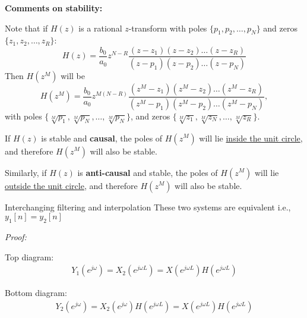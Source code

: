 \documentclass[10pt, handout]{beamer}
\begin{document}
\begin{frame}
\textbf{Comments on stability:}

Note that if $H(z)$ is a rational $z$-transform with poles $\{p_1, p_2, \ldots, p_N\}$ and zeros $\{z_1, z_2, \ldots, z_R\}$:
\begin{equation*}
H(z) = \frac{b_0}{a_0}z^{N-R}\frac{(z-z_1)(z-z_2)\ldots(z-z_R)}{(z-p_1)(z-p_2)\ldots(z-p_N)}
\end{equation*}
Then $H(z^M)$ will be
\begin{equation*}
H(z^M) = \frac{b_0}{a_0}z^{M(N-R)}\frac{(z^M-z_1)(z^M-z_2)\ldots(z^M-z_R)}{(z^M-p_1)(z^M-p_2)\ldots(z^M-p_N)},
\end{equation*}
with poles $\{\sqrt[M]{p_1}, \sqrt[M]{p_N}, \ldots, \sqrt[M]{p_N}\}$, and zeros $\{\sqrt[M]{z_1}, \sqrt[M]{z_N}, \ldots, \sqrt[M]{z_R}\}$.
 
If $H(z)$ is stable and \textbf{causal}, the poles of $H(z^M)$ will lie \underline{inside the unit circle}, and therefore $H(z^M)$ will also be stable.

Similarly, if $H(z)$ is \textbf{anti-causal} and stable, the poles of $H(z^M)$ will lie \underline{outside the unit circle}, and therefore $H(z^M)$ will also be stable.

\end{frame}


\begin{frame}{Interchanging filtering and interpolation}
	These two systems are equivalent i.e., $y_1[n] = y_2[n]$
	\begin{center}
		\resizebox{0.6\linewidth}{!}{}
	\end{center}	
	\textit{Proof:}
	
	Top diagram:
	\begin{align*}
	Y_1(e^{j\omega}) = X_2(e^{j\omega L}) = X(e^{j\omega L})H(e^{j\omega L}) 
	\end{align*}
	
	Bottom diagram:
	\begin{align*}
	Y_2(e^{j\omega}) = X_2(e^{j\omega})H(e^{j\omega L}) = X(e^{j\omega L})H(e^{j\omega L}) 
	\end{align*}
\end{frame}
\end{document}
